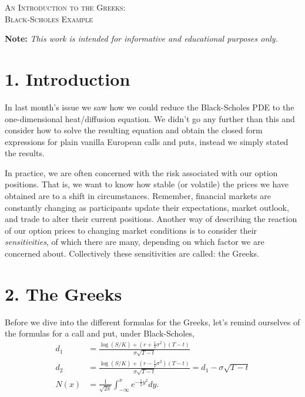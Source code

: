 \documentclass[11pt]{article}
\begin{document}

\begin{tcolorbox}
\begin{center}
    \large
    \textsc{An Introduction to the Greeks: \\ Black-Scholes Example}
\end{center}
\end{tcolorbox}

\begin{center}
\textbf{Note:} \textit{This work is intended for informative and educational purposes only.}
\end{center}

\section*{1. Introduction}
In last month's issue we saw how we could reduce the Black-Scholes PDE to the one-dimensional heat/diffusion equation. We didn't go any further than this and consider how to solve the resulting equation and obtain the closed form expressions for plain vanilla European calls and puts, instead we simply stated the results. 

In practice, we are often concerned with the risk associated with our option positions. That is, we want to know how stable (or volatile) the prices we have obtained are to a shift in circumstances. Remember, financial markets are constantly changing as participants update their expectations, market outlook, and trade to alter their current positions. Another way of describing the reaction of our option prices to changing market conditions is to consider their \textit{sensitivities}, of which there are many, depending on which factor we are concerned about. Collectively these sensitivities are called: the Greeks.

\section*{2. The Greeks}

Before we dive into the different formulas for the Greeks, let's remind ourselves of the formulas for a call and put, under Black-Scholes,
\begin{align}
    d_1 &= \frac{\log (S/K) + (r + \frac{1}{2} \sigma^2)(T-t)}{\sigma \sqrt{T-t}} \\
    d_2 &= \frac{\log (S/K) + (r - \frac{1}{2} \sigma^2)(T-t)}{\sigma \sqrt{T-t}} = d_1 - \sigma \sqrt{T-t} \\
    N(x) &= \frac{1}{\sqrt{2 \pi}} \int_{-\infty}^{x} e^{-\frac{1}{2}y^2} dy.
\end{align}
\end{document}

